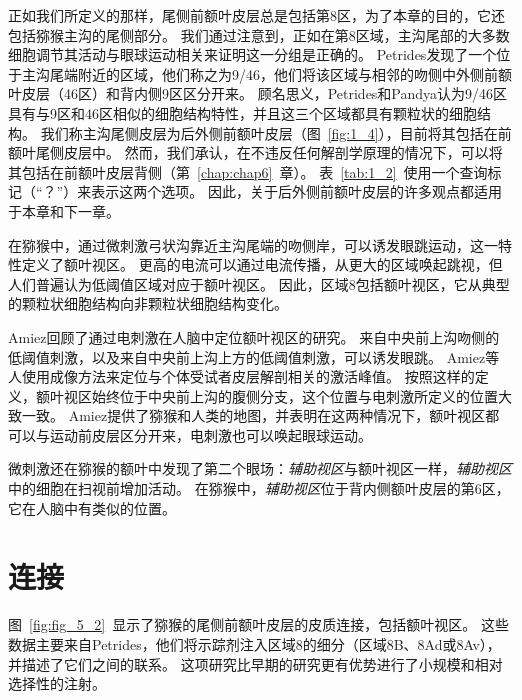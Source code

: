 正如我们所定义的那样，尾侧前额叶皮层总是包括第8区，为了本章的目的，它还包括猕猴主沟的尾侧部分。
我们通过注意到，正如在第8区域\cite{chafee1998matching}，主沟尾部的大多数细胞调节其活动与眼球运动相关\cite{tanila1993regional}来证明这一分组是正确的。
Petrides\cite{petrides1999dorsolateral}发现了一个位于主沟尾端附近的区域，他们称之为9/46，他们将该区域与相邻的吻侧中外侧前额叶皮层（46区）和背内侧9区区分开来。
顾名思义，Petrides和Pandya认为9/46区具有与9区和46区相似的细胞结构特性，并且这三个区域都具有颗粒状的细胞结构。
我们称主沟尾侧皮层为后外侧前额叶皮层（图~\ref{fig:1_4}），目前将其包括在前额叶尾侧皮层中。
然而，我们承认，在不违反任何解剖学原理的情况下，可以将其包括在前额叶皮层背侧（第~\ref{chap:chap6}~章）。
表~\ref{tab:1_2}~使用一个查询标记（“？”）来表示这两个选项。
因此，关于后外侧前额叶皮层的许多观点都适用于本章和下一章。


在猕猴中，通过微刺激弓状沟靠近主沟尾端的吻侧岸，可以诱发眼跳运动\cite{bruce1985primate}，这一特性定义了额叶视区。
更高的电流可以通过电流传播，从更大的区域唤起跳视\cite{robinson1969eye}，但人们普遍认为低阈值区域对应于额叶视区。
因此，区域8包括额叶视区，它从典型的颗粒状细胞结构向非颗粒状细胞结构变化\cite{stanton1989cytoarchitectural}。


Amiez\cite{amiez2009anatomical}回顾了通过电刺激在人脑中定位额叶视区的研究。
来自中央前上沟吻侧的低阈值刺激，以及来自中央前上沟上方的低阈值刺激，可以诱发眼跳。
Amiez等人\cite{amiez2006local}使用成像方法来定位与个体受试者皮层解剖相关的激活峰值。
按照这样的定义，额叶视区始终位于中央前上沟的腹侧分支，这个位置与电刺激所定义的位置大致一致。
Amiez\cite{amiez2009anatomical}提供了猕猴和人类的地图，并表明在这两种情况下，额叶视区都可以与运动前皮层区分开来，电刺激也可以唤起眼球运动。


微刺激还在猕猴的额叶中发现了第二个眼场：\textit{辅助视区}\cite{schlag1987evidence}与额叶视区一样，\textit{辅助视区}中的细胞在扫视前增加活动\cite{hanes1995relationship}。
在猕猴中，\textit{辅助视区}位于背内侧额叶皮层的第6区\cite{schlag1987evidence}，它在人脑中有类似的位置\cite{amiez2009anatomical}。



\section{连接}

图~\ref{fig:fig_5_2}~显示了猕猴的尾侧前额叶皮层的皮质连接，包括额叶视区。
这些数据主要来自Petrides\cite{petrides1999dorsolateral}，他们将示踪剂注入区域8的细分（区域8B、8Ad或8Av），并描述了它们之间的联系。
这项研究比早期的研究更有优势\cite{petrides1984projections,barbas1988anatomic,barbas1989architecture,cavada1989posterior}进行了小规模和相对选择性的注射。


